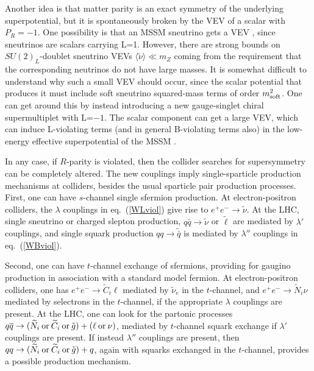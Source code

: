 \documentclass[11pt]{article}
\def\stilde{\widetilde}
\begin{document}
Another idea is that matter parity is an exact symmetry of the underlying 
superpotential, but it is spontaneously broken by the VEV of a scalar with 
$P_R=-1$.  One possibility is that an MSSM sneutrino gets a VEV 
\cite{sneutvevRPV}, since sneutrinos are scalars carrying L=1. However, 
there are strong bounds \cite{nonsneutvevRPV} on $SU(2)_L$-doublet 
sneutrino VEVs $\langle \stilde \nu \rangle \ll m_Z$ coming from the 
requirement that the corresponding neutrinos do not have large masses. It 
is somewhat difficult to understand why such a small VEV should occur, 
since the scalar potential that produces it must include soft sneutrino 
squared-mass terms of order $m^2_{\rm soft}$. One can get around this by 
instead introducing a new gauge-singlet chiral supermultiplet with L=$-1$. 
The scalar component can get a large VEV, which can induce L-violating 
terms (and in general B-violating terms also) in the low-energy effective 
superpotential of the MSSM \cite{nonsneutvevRPV}.

In any case, if $R$-parity is violated, then the collider searches for
supersymmetry can be completely altered. The new couplings imply
single-sparticle production mechanisms at colliders, besides the usual
sparticle pair production processes. First, one can have $s$-channel
single sfermion production. At electron-positron colliders, the $\lambda$
couplings in eq.~(\ref{WLviol}) give rise to $e^+e^-\rightarrow \stilde
\nu$. At the LHC, single sneutrino or charged slepton
production, $q \bar q \rightarrow \stilde \nu$ or $\stilde \ell$ are
mediated by $\lambda'$ couplings, and single squark production $qq
\rightarrow \stilde {\bar q}$ is mediated by $\lambda''$ couplings in
eq.~(\ref{WBviol}). 

Second, one can have $t$-channel exchange of sfermions, providing for
gaugino production in association with a standard model fermion. At
electron-positron colliders, one has $e^+ e^- \rightarrow \stilde C_i
\ell$ mediated by $\stilde \nu_e$ in the $t$-channel, and $e^+ e^-
\rightarrow \stilde N_i \nu$ mediated by selectrons in the $t$-channel, if
the appropriate $\lambda$ couplings are present. At the 
LHC, one can look for the partonic processes $q\overline q \rightarrow
(\stilde N_i\>{\rm or}\>\stilde C_i\>{\rm or}\>\tilde g)+(\ell\>{\rm
or}\>\nu)$, mediated by $t$-channel squark exchange if $\lambda'$
couplings are present. If instead $\lambda''$ couplings are present, then
$qq \rightarrow (\stilde N_i\>{\rm or}\>\stilde C_i\>{\rm or}\>\tilde g)+
q$, again with squarks exchanged in the $t$-channel, provides a possible
production mechanism. 
\end{document}
